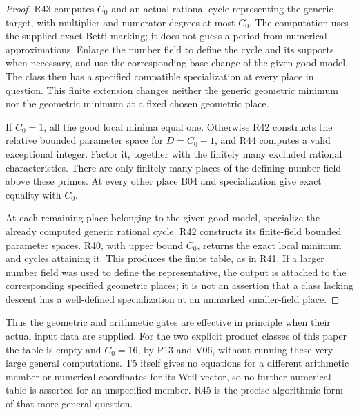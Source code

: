 \begin{proof}
R43 computes $C_0$ and an actual rational cycle representing the
generic target, with multiplier and numerator degrees at most $C_0$.
The computation uses the supplied exact Betti marking; it does not
guess a period from numerical approximations. Enlarge the number field
to define the cycle and its supports when necessary, and use the
corresponding base change of the given good model. The class then has
a specified compatible specialization at every place in question.
This finite extension changes neither the generic geometric minimum
nor the geometric minimum at a fixed chosen geometric place.

If $C_0=1$, all the good local minima equal one. Otherwise R42
constructs the relative bounded parameter space for $D=C_0-1$, and
R44 computes a valid exceptional integer. Factor it, together with
the finitely many excluded rational characteristics. There are only
finitely many places of the defining number field above these primes.
At every other place B04 and specialization give exact equality with
$C_0$.

At each remaining place belonging to the given good model, specialize
the already computed generic rational cycle. R42 constructs its
finite-field bounded parameter spaces. R40, with upper bound $C_0$,
returns the exact local minimum and cycles attaining it. This produces
the finite table, as in R41. If a larger number field was used to
define the representative, the output is attached to the corresponding
specified geometric places; it is not an assertion that a class lacking
descent has a well-defined specialization at an unmarked smaller-field
place.
\end{proof}

Thus the geometric and arithmetic gates are effective in principle
when their actual input data are supplied. For the two explicit product
classes of this paper the table is empty and $C_0=16$, by P13 and V06,
without running these very large general computations. T5 itself gives
no equations for a different arithmetic member or numerical coordinates
for its Weil vector, so no further numerical table is asserted for an
unspecified member. R45 is the precise algorithmic form of that more
general question.
